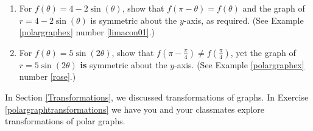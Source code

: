 \begin{enumerate}
\begin{enumerate}

\item  For $f(\theta) = 4-2\sin(\theta)$, show that $f(\pi - \theta) = f(\theta)$ and the graph of $r = 4-2\sin(\theta)$ is symmetric about the $y$-axis, as required.  (See Example \ref{polargraphex} number \ref{limacon01}.)

\item  For $f(\theta) = 5\sin(2\theta)$, show that $f\left(\pi - \frac{\pi}{4} \right) \neq  f\left(  \frac{\pi}{4} \right)$,  yet the graph of $r = 5\sin(2\theta)$ \textbf{is} symmetric about the $y$-axis.  (See  Example \ref{polargraphex} number  \ref{rose}.)

\end{enumerate}

\setcounter{HW}{\value{enumi}}

\end{enumerate}

In Section \ref{Transformations}, we discussed transformations of graphs.   In Exercise \ref{polargraphtransformations} we have you and your classmates explore transformations of polar graphs. 


